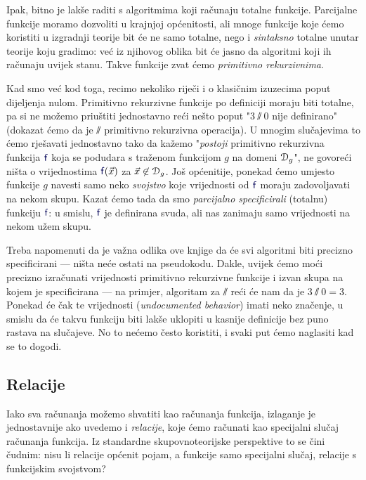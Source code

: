 Ipak, bitno je  lakše raditi s algoritmima koji računaju totalne funkcije. Parcijalne funkcije moramo dozvoliti u krajnjoj općenitosti, ali mnoge funkcije koje ćemo koristiti u izgradnji teorije bit će ne samo totalne, nego i \emph{sintaksno} totalne unutar teorije koju gradimo: već iz njihovog oblika bit će jasno da algoritmi koji ih računaju uvijek stanu. Takve funkcije zvat ćemo \emph{primitivno rekurzivnima}.

Kad smo već kod toga, recimo nekoliko riječi i o klasičnim izuzecima poput dijeljenja nulom. Primitivno rekurzivne funkcije po definiciji moraju biti totalne, pa si ne možemo priuštiti jednostavno reći nešto poput "$3\sslash0$ nije definirano" (dokazat ćemo da je $\sslash$ primitivno rekurzivna operacija). U mnogim slučajevima to ćemo rješavati jednostavno tako da kažemo "\emph{postoji} primitivno rekurzivna funkcija $\f{f}$ koja se podudara s traženom funkcijom $g$ na domeni $\mathcal D_{g}$", ne govoreći ništa o vrijednostima $\f{f}(\vec x)$ za $\vec x\not\in\mathcal D_{g}$. Još općenitije, ponekad ćemo umjesto funkcije $g$ navesti samo neko \emph{svojstvo} koje vrijednosti od $\f{f}$ moraju zadovoljavati na nekom skupu. Kazat ćemo tada da smo \emph{parcijalno specificirali} (totalnu) funkciju $\f{f}$: u smislu, $\f{f}$ je definirana svuda, ali nas zanimaju samo vrijednosti na nekom užem skupu.

Treba napomenuti da je važna odlika ove knjige da će svi algoritmi biti precizno specificirani --- ništa neće ostati na pseudokodu. Dakle, uvijek ćemo moći precizno izračunati vrijednosti primitivno rekurzivne funkcije i izvan skupa na kojem je specificirana --- na primjer, algoritam za $\sslash$ reći će nam da je $3\sslash 0=3$. Ponekad će čak te vrijednosti (\emph{undocumented behavior}) imati neko značenje, u smislu da će takvu funkciju biti lakše uklopiti u kasnije definicije bez puno rastava na slučajeve. No to nećemo često koristiti, i svaki put ćemo naglasiti kad se to dogodi.

\subsection{Relacije}

Iako sva računanja možemo shvatiti kao računanja funkcija, izlaganje je jednostavnije ako uvedemo i \emph{relacije}, koje ćemo računati kao specijalni slučaj računanja funkcija. Iz standardne skupovnoteorijske perspektive to se čini čudnim: nisu li relacije općenit pojam, a funkcije samo specijalni slučaj, relacije s funkcijskim svojstvom?

